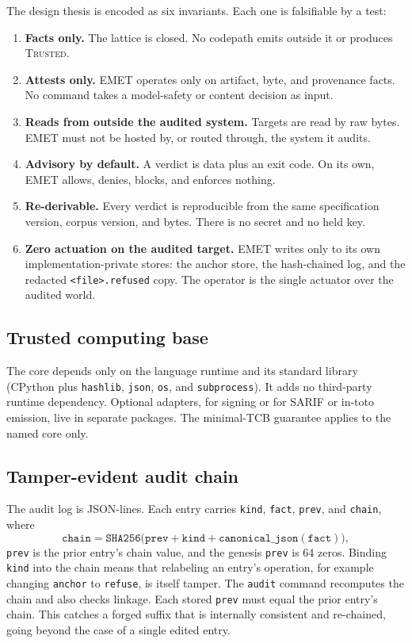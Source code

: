\documentclass[11pt]{article}
\begin{document}
The design thesis is encoded as six invariants. Each one is falsifiable by a test:
\begin{enumerate}[leftmargin=*,itemsep=1pt]
\item \textbf{Facts only.} The lattice is closed. No codepath emits outside it or produces \textsc{Trusted}.
\item \textbf{Attests only.} EMET operates only on artifact, byte, and provenance facts. No command takes a model-safety or content decision as input.
\item \textbf{Reads from outside the audited system.} Targets are read by raw bytes. EMET must not be hosted by, or routed through, the system it audits.
\item \textbf{Advisory by default.} A verdict is data plus an exit code. On its own, EMET allows, denies, blocks, and enforces nothing.
\item \textbf{Re-derivable.} Every verdict is reproducible from the same specification version, corpus version, and bytes. There is no secret and no held key.
\item \textbf{Zero actuation on the audited target.} EMET writes only to its own implementation-private stores: the anchor store, the hash-chained log, and the redacted \texttt{<file>.refused} copy. The operator is the single actuator over the audited world.
\end{enumerate}

\subsection{Trusted computing base}

The core depends only on the language runtime and its standard library (CPython plus \texttt{hashlib}, \texttt{json}, \texttt{os}, and \texttt{subprocess}). It adds no third-party runtime dependency. Optional adapters, for signing or for SARIF or in-toto emission, live in separate packages. The minimal-TCB guarantee applies to the named core only.

\subsection{Tamper-evident audit chain}

The audit log is JSON-lines. Each entry carries \texttt{kind}, \texttt{fact}, \texttt{prev}, and \texttt{chain}, where
\[
\texttt{chain} = \texttt{SHA256}\bigl(\texttt{prev} + \texttt{kind} + \texttt{canonical\_json}(\texttt{fact})\bigr),
\]
\texttt{prev} is the prior entry's chain value, and the genesis \texttt{prev} is 64 zeros. Binding \texttt{kind} into the chain means that relabeling an entry's operation, for example changing \texttt{anchor} to \texttt{refuse}, is itself tamper. The \texttt{audit} command recomputes the chain and also checks linkage. Each stored \texttt{prev} must equal the prior entry's chain. This catches a forged suffix that is internally consistent and re-chained, going beyond the case of a single edited entry.
\end{document}
